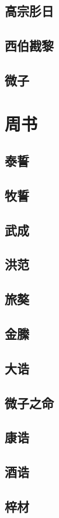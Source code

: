 \documentclass[a4paper,12pt,UTF8,twoside]{ctexbook}
\begin{document}
\chapter{高宗肜日}
\chapter{西伯戡黎}
\chapter{微子}

\part{周书}

\chapter{泰誓}
\chapter{牧誓}
\chapter{武成}
\chapter{洪范}
\chapter{旅獒}
\chapter{金縢}

\chapter{大诰}
\chapter{微子之命}
\chapter{康诰}
\chapter{酒诰}
\chapter{梓材}
\end{document}
